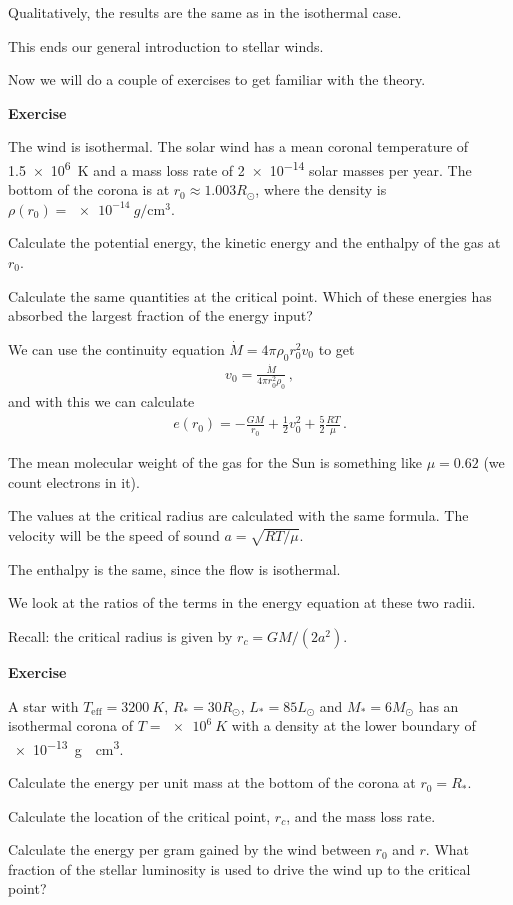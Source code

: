\documentclass[main.tex]{subfiles}
\begin{document}
Qualitatively, the results are the same as in the isothermal case.

This ends our general introduction to stellar winds.

Now we will do a couple of exercises to get familiar with the theory. 

\begin{greenbox} \textbf{Exercise}

The wind is isothermal.
The solar wind has a mean coronal temperature of \SI{1.5e6}{K} and a mass loss rate of \num{2e-14} solar masses per year.
The bottom of the corona is at \(r_0 \approx 1.003 R_{\odot}\), where the density is \(\rho (r_0 ) = \SI{e-14}{g\per\centi\metre\cubed}\).

Calculate the potential energy, the kinetic energy and the enthalpy of the gas at \(r_0 \).

Calculate the same quantities at the critical point. Which of these energies has absorbed the largest fraction of the energy input?
\end{greenbox}

\begin{bluebox}
We can use the continuity equation \(\dot{M} = 4 \pi \rho_0 r_0^2 v_0 \) to get 
%
\begin{align}
  v_0 = \frac{\dot{M}}{4 \pi r_0^2 \rho_0 }
\,,
\end{align}
%
and with this we can calculate 
%
\begin{align}
  e(r_0 ) = - \frac{GM}{r_0 } + \frac{1}{2} v_0^2 + \frac{5}{2} \frac{RT}{\mu }
\,.
\end{align}

The mean molecular weight of the gas for the Sun is something like \(\mu = 0.62\) (we count electrons in it).

The values at the critical radius are calculated with the same formula. The velocity will be the speed of sound \(a = \sqrt{RT / \mu } \).

The enthalpy is the same, since the flow is isothermal.

We look at the ratios of the terms in the energy equation at these two radii.

Recall: the critical radius is given by \(r_c = GM / (2 a^2)\).

\end{bluebox}

\begin{greenbox}
    \textbf{Exercise}

  A star with \(T _{\text{eff}} = \SI{3200}{K}\), \(R_{*} = 30 R_{\odot}\), \(L_{*} = 85 L_{\odot}\) and \(M_{*} = 6 M_{\odot}\) has an isothermal corona of \(T = \SI{e6}{K}\) with a density at the lower boundary of \SI{e-13}{g \per\centi\metre\cubed}.

  Calculate the energy per unit mass at the bottom of the corona at \(r_0 = R_{*}\).

  Calculate the location of the critical point, \(r_c\), and the mass loss rate.

  Calculate the energy per gram gained by the wind between \(r_0 \) and \(r\). What fraction of the stellar luminosity is used to drive the wind up to the critical point?
\end{greenbox}
\end{document}
